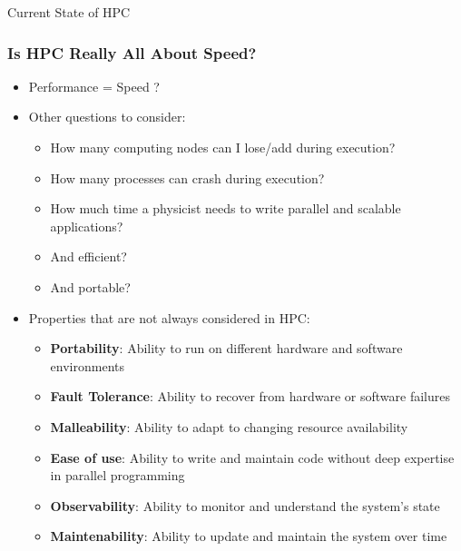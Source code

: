 \documentclass[10pt,aspectratio=1609]{beamer}
\begin{document}
\begin{section}{Current State of HPC}
 \begin{frame}
   \frametitle{Is HPC Really All About Speed?}
   \begin{itemize}
     \item Performance = Speed ?
     \item Other questions to consider:
           \begin{itemize}
             \item How many computing nodes can I lose/add during execution?
             \item How many processes can crash during execution?
             \item How much time a physicist needs to write parallel and scalable applications?
             \item And efficient?
             \item And portable?
           \end{itemize}
     \item Properties that are not always considered in HPC:
           \begin{itemize}
             \item \textbf{Portability}: Ability to run on different hardware and software environments
             \item \textbf{Fault Tolerance}: Ability to recover from hardware or software failures
             \item \textbf{Malleability}: Ability to adapt to changing resource availability
             \item \textbf{Ease of use}: Ability to write and maintain code without deep expertise in parallel programming
             \item \textbf{Observability}: Ability to monitor and understand the system's state
             \item \textbf{Maintenability}: Ability to update and maintain the system over time
           \end{itemize}
   \end{itemize}
 \end{frame}
\end{section}
\end{document}
